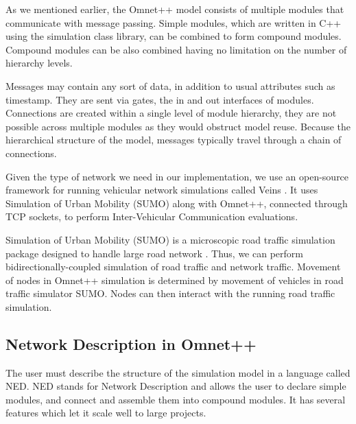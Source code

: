 As we mentioned earlier, the Omnet++ model consists of multiple modules that
communicate with message passing. Simple modules, which are written in C++ using
the simulation class library, can be combined to form compound modules. Compound
modules can be also combined having no limitation on the number of hierarchy
levels.

Messages may contain any sort of data, in addition to usual attributes such as
timestamp. They are sent via gates, the in and out interfaces of modules.
Connections are created within a single level of module hierarchy, they are not
possible across multiple modules as they would obstruct model reuse. Because the
hierarchical structure of the model, messages typically travel through a chain
of connections.

Given the type of network we need in our implementation, we use an
open-source framework for running vehicular network simulations called Veins \cite{veins}.
It uses Simulation of Urban Mobility (SUMO) along with Omnet++, connected
through TCP sockets, to perform Inter-Vehicular Communication evaluations.

Simulation of Urban Mobility (SUMO) is a microscopic road traffic simulation
package designed to handle large road network \cite{sumo}. Thus, we can perform
bidirectionally-coupled simulation of road traffic and network traffic. Movement
of nodes in Omnet++ simulation is determined by movement of vehicles in road
traffic simulator SUMO. Nodes can then interact with the running road traffic
simulation.

\subsection{Network Description in Omnet++}

The user must describe the structure of the simulation model in a language
called NED. NED stands for Network Description and allows the user to declare
simple modules, and connect and assemble them into compound modules. It has
several features which let it scale well to large projects.

